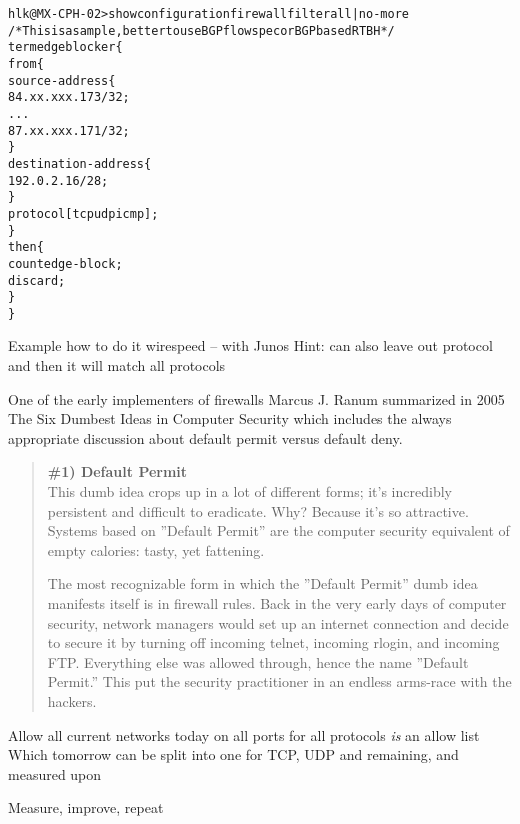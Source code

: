 \documentclass[Screen16to9,17pt]{foils}
\begin{document}
\begin{alltt}\footnotesize
hlk@MX-CPH-02> show configuration firewall filter all | no-more
/* This is a sample, better to use BGP flowspec or BGP based RTBH */
term edgeblocker \{
    from \{
        source-address \{
            84.xx.xxx.173/32;
...
            87.xx.xxx.171/32;
        \}
        destination-address \{
            192.0.2.16/28;
        \}
        protocol [ tcp udp icmp ];
    \}
    then \{
        count edge-block;
        discard;
    \}
\}
\end{alltt}{\footnotesize
Example how to do it wirespeed -- with Junos
Hint: can also leave out protocol and then it will match all protocols}




One of the early implementers of firewalls Marcus J. Ranum summarized in 2005 The Six Dumbest Ideas in Computer Security  which includes the always appropriate discussion about default permit versus default deny.

\begin{quote}\small {\bf
\#1) Default Permit}\\
This dumb idea crops up in a lot of different forms; it’s incredibly persistent and difficult to eradicate. Why? Because it’s so attractive. Systems based on ”Default Permit” are the computer security equivalent of empty calories: tasty, yet fattening.

The most recognizable form in which the ”Default Permit” dumb idea manifests itself is in firewall rules. Back in the very early days of computer security, network managers would set up an internet connection and decide to secure it by turning off incoming telnet, incoming rlogin, and incoming FTP. Everything else was allowed through, hence the name ”Default Permit.” This put the security practitioner in an endless arms-race with the hackers.
\end{quote}


\begin{list2}
\item Allow all current networks today on all ports for all protocols \emph{is} an allow list \\
Which tomorrow can be split into one for TCP, UDP and remaining, and measured upon
\item Measure, improve, repeat
\end{list2}
\end{document}
